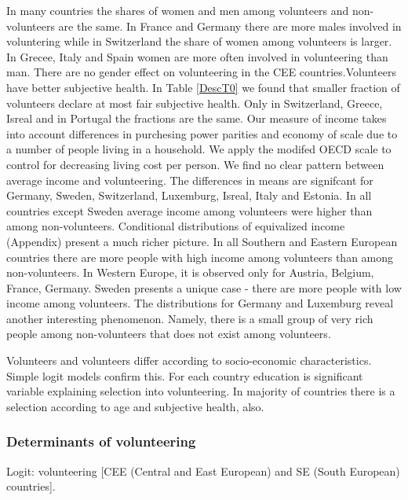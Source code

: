 \documentclass[10pt, letterpaper]{article}
\begin{document}
\begin{spacing}{1.4}
In many countries the shares of women and men among volunteers and non-volunteers are the same. In France and Germany there are more males involved in voluntering while in Switzerland the share of women among volunteers is larger. In Grecee, Italy and Spain women are more often involved in volunteering than man. There are no gender effect on volunteering in the CEE countries.Volunteers have better subjective health.  In Table \ref{DescT0} we found that smaller fraction of volunteers declare at most fair subjective health. Only in Switzerland, Greece, Isreal and in Portugal the fractions are the same.  Our measure of income takes into account differences in purchesing power parities and economy of scale due to a number of people living in a household. We apply the modifed OECD scale to control for decreasing living cost per person. We find no clear pattern between average income and volunteering. The differences in means are signifcant for Germany, Sweden, Switzerland, Luxemburg, Isreal, Italy and Estonia. In all countries except Sweden average income among volunteers were higher than among non-volunteers. Conditional distributions of equivalized income (Appendix) present a much richer picture. In all Southern and Eastern European countries there are more people with high income among volunteers than among non-volunteers. In  Western Europe, it is observed only for  Austria, Belgium, France, Germany. Sweden presents a unique case - there are more people with low income among volunteers. The distributions for Germany and Luxemburg reveal another interesting phenomenon. Namely, there is a small group of very rich people among non-volunteers that does not exist among volunteers.

Volunteers and volunteers differ according to socio-economic characteristics. Simple logit models confirm this. For each country education is significant variable explaining selection into volunteering. In majority of countries there is a selection according to age and subjective health, also. 

\subsubsection{Determinants of volunteering}




\begin{spacing}{.9}
\begin{table}[H]
\centering 
\caption{Logit: volunteering [CEE (Central and East European) and SE (South European) countries].}  
\begin{small} 
	 
      \label{logitCEE} 
\end{small}
\end{table}
\end{spacing}


\end{spacing}
\end{document}

